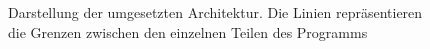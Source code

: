 \begin{figure}[h]
    \caption[some Caption]{Darstellung der umgesetzten Architektur.
    Die Linien repräsentieren die Grenzen zwischen den einzelnen Teilen des Programms \footnotemark}
    \label{fig:sp2d}
\end{figure}